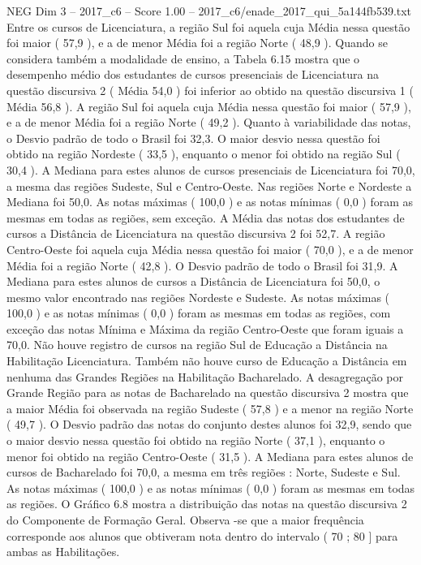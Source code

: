 \begin{textsample}{NEG Dim 3 – 2017\_c6 – Score 1.00 – 2017\_c6/enade\_2017\_qui\_5a144fb539.txt}
Entre os cursos de Licenciatura, a região Sul foi aquela cuja Média nessa questão foi maior ( 57,9 ), e a de menor Média foi a região Norte ( 48,9 ).
Quando se considera também a modalidade de ensino, a Tabela 6.15 mostra que o desempenho médio dos estudantes de cursos presenciais de Licenciatura na questão discursiva 2 ( Média 54,0 ) foi inferior ao obtido na questão discursiva 1 ( Média 56,8 ).
A região Sul foi aquela cuja Média nessa questão foi maior ( 57,9 ), e a de menor Média foi a região Norte ( 49,2 ).
Quanto à variabilidade das notas, o Desvio padrão de todo o Brasil foi 32,3.
O maior desvio nessa questão foi obtido na região Nordeste ( 33,5 ), enquanto o menor foi obtido na região Sul ( 30,4 ).
A Mediana para estes alunos de cursos presenciais de Licenciatura foi 70,0, a mesma das regiões Sudeste, Sul e Centro-Oeste.
Nas regiões Norte e Nordeste a Mediana foi 50,0.
As notas máximas ( 100,0 ) e as notas mínimas ( 0,0 ) foram as mesmas em todas as regiões, sem exceção.
A Média das notas dos estudantes de cursos a Distância de Licenciatura na questão discursiva 2 foi 52,7.
A região Centro-Oeste foi aquela cuja Média nessa questão foi maior ( 70,0 ), e a de menor Média foi a região Norte ( 42,8 ).
O Desvio padrão de todo o Brasil foi 31,9.
A Mediana para estes alunos de cursos a Distância de Licenciatura foi 50,0, o mesmo valor encontrado nas regiões Nordeste e Sudeste.
As notas máximas ( 100,0 ) e as notas mínimas ( 0,0 ) foram as mesmas em todas as regiões, com exceção das notas Mínima e Máxima da região Centro-Oeste que foram iguais a 70,0.
Não houve registro de cursos na região Sul de Educação a Distância na Habilitação Licenciatura.
Também não houve curso de Educação a Distância em nenhuma das Grandes Regiões na Habilitação Bacharelado.
A desagregação por Grande Região para as notas de Bacharelado na questão discursiva 2 mostra que a maior Média foi observada na região Sudeste ( 57,8 ) e a menor na região Norte ( 49,7 ).
O Desvio padrão das notas do conjunto destes alunos foi 32,9, sendo que o maior desvio nessa questão foi obtido na região Norte ( 37,1 ), enquanto o menor foi obtido na região Centro-Oeste ( 31,5 ).
A Mediana para estes alunos de cursos de Bacharelado foi 70,0, a mesma em três regiões : Norte, Sudeste e Sul.
As notas máximas ( 100,0 ) e as notas mínimas ( 0,0 ) foram as mesmas em todas as regiões.
O Gráfico 6.8 mostra a distribuição das notas na questão discursiva 2 do Componente de Formação Geral.
Observa -se que a maior frequência corresponde aos alunos que obtiveram nota dentro do intervalo ( 70 ; 80 ] para ambas as Habilitações.

\end{textsample}
